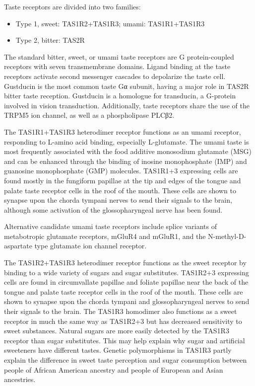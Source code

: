 Taste receptors are divided into two families:

\begin{itemize}
\tightlist
\item
  Type 1, sweet: TAS1R2+TAS1R3; umami: TAS1R1+TAS1R3
\item
  Type 2, bitter: TAS2R
\end{itemize}

The standard bitter, sweet, or umami taste receptors are G protein-coupled receptors with seven transmembrane domains. Ligand binding at the taste receptors activate second messenger cascades to depolarize the taste cell. Gustducin is the most common taste Gα subunit, having a major role in TAS2R bitter taste reception. Gustducin is a homologue for transducin, a G-protein involved in vision transduction. Additionally, taste receptors share the use of the TRPM5 ion channel, as well as a phospholipase PLCβ2.

The TAS1R1+TAS1R3 heterodimer receptor functions as an umami receptor, responding to L-amino acid binding, especially L-glutamate. The umami taste is most frequently associated with the food additive monosodium glutamate (MSG) and can be enhanced through the binding of inosine monophosphate (IMP) and guanosine monophosphate (GMP) molecules. TAS1R1+3 expressing cells are found mostly in the fungiform papillae at the tip and edges of the tongue and palate taste receptor cells in the roof of the mouth. These cells are shown to synapse upon the chorda tympani nerves to send their signals to the brain, although some activation of the glossopharyngeal nerve has been found.

Alternative candidate umami taste receptors include splice variants of metabotropic glutamate receptors, mGluR4 and mGluR1, and the N-methyl-D-aspartate type glutamate ion channel receptor.

The TAS1R2+TAS1R3 heterodimer receptor functions as the sweet receptor by binding to a wide variety of sugars and sugar substitutes. TAS1R2+3 expressing cells are found in circumvallate papillae and foliate papillae near the back of the tongue and palate taste receptor cells in the roof of the mouth. These cells are shown to synapse upon the chorda tympani and glossopharyngeal nerves to send their signals to the brain. The TAS1R3 homodimer also functions as a sweet receptor in much the same way as TAS1R2+3 but has decreased sensitivity to sweet substances. Natural sugars are more easily detected by the TAS1R3 receptor than sugar substitutes. This may help explain why sugar and artificial sweeteners have different tastes. Genetic polymorphisms in TAS1R3 partly explain the difference in sweet taste perception and sugar consumption between people of African American ancestry and people of European and Asian ancestries.

